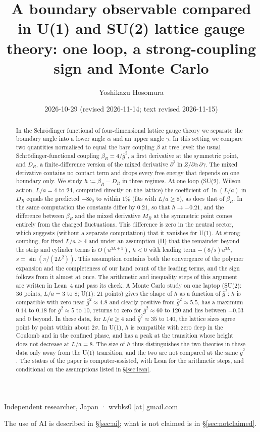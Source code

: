 \documentclass[11pt,a4paper]{article}
\title{A boundary observable compared in U(1) and SU(2) lattice gauge theory: one loop, a strong-coupling sign and Monte Carlo}
\author{Yoshikazu Hosomura}
\date{2026-10-29 (revised 2026-11-14; text revised 2026-11-15)}
\theoremstyle{definition}
\theoremstyle{remark}
\newcommand{\gb}{\bar g^{2}}
\newcommand{\bR}{\beta_R}
\newcommand{\DR}{D_R}
\begin{document}
\maketitle
\begin{center}\small Independent researcher, Japan · wvbks0 [at] gmail.com\end{center}
\begin{center}\small The use of AI is described in \S\ref{sec:ai}; what is not claimed is in \S\ref{sec:notclaimed}.\end{center}

\begin{abstract}
In the Schrödinger functional of four-dimensional lattice gauge theory we separate the boundary angle into a lower angle $\alpha$ and an upper angle $\gamma$. In this setting we compare two quantities normalised to equal the bare coupling $\beta$ at tree level: the usual Schrödinger-functional coupling $\bR=4/\gb$, a first derivative at the symmetric point, and $\DR$, a finite-difference version of the mixed derivative $\partial^2\ln Z/\partial\alpha\,\partial\gamma$. The mixed derivative contains no contact term and drops every free energy that depends on one boundary only. We study $h:=\bR-\DR$ in three regimes. At one loop (SU(2), Wilson action, $L/a=4$ to $24$, computed directly on the lattice) the coefficient of $\ln(L/a)$ in $\DR$ equals the predicted $-8b_0$ to within $1\%$ (fits with $L/a\ge8$), as does that of $\bR$. In the same computation the constants differ by $0.21$, so that $h\to-0.21$, and the difference between $\bR$ and the mixed derivative $M_R$ at the symmetric point comes entirely from the charged fluctuations. This difference is zero in the neutral sector, which suggests (without a separate computation) that it vanishes for U(1). At strong coupling, for fixed $L/a\ge4$ and under an assumption (H) that the remainder beyond the strip and cylinder terms is $O(u^{3L+1})$, $h<0$ with leading term $-(8/s)u^{3L}$, $s=\sin(\pi/(2L^2))$. This assumption contains both the convergence of the polymer expansion and the completeness of our hand count of the leading terms, and the sign follows from it almost at once. The arithmetic and inequality steps of this argument are written in Lean~4 and pass its check. A Monte Carlo study on one laptop (SU(2): 36 points, $L/a=3$ to $8$; U(1): 21 points) gives the shape of $h$ as a function of $\gb$: $h$ is compatible with zero near $\gb\approx4.8$ and clearly positive from $\gb\approx5.5$, has a maximum $0.14$ to $0.18$ for $\gb\approx5$ to $10$, returns to zero for $\gb\approx60$ to $120$ and lies between $-0.03$ and $0$ beyond. In these data, for $L/a\ge4$ and $\gb\approx35$ to $140$, the lattice sizes agree point by point within about $2\sigma$. In U(1), $h$ is compatible with zero deep in the Coulomb and in the confined phase, and has a peak at the transition whose height does not decrease at $L/a=8$. The size of $h$ thus distinguishes the two theories in these data only away from the U(1) transition, and the two are not compared at the same $\gb$. The status of the paper is computer-assisted, with Lean for the arithmetic steps, and conditional on the assumptions listed in \S\ref{sec:lean}.
\end{abstract}
\end{document}
